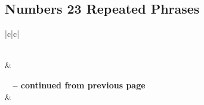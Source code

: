 \subsection{Numbers 23 Repeated Phrases}


\normalsize
 
\begin{center}
\begin{longtable}{|c|c|}
\caption[Numbers 23 Repeated Phrases]{Numbers 23 Repeated Phrases}\label{table:Repeated Phrases Numbers 23} \\
\hline {} &  \\ \hline 
\endfirsthead
 
{{\bfseries \tablename\ \thetable{} -- continued from previous page}} \\  
\hline {} &  \\ \hline 
\endhead
 

\end{longtable}
\end{center}
